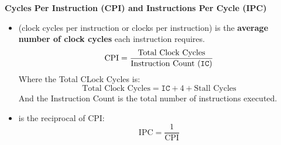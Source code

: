 \highspace
\begin{flushleft}
  \textcolor{Green3}{\faIcon{\speedIcon} \textbf{Cycles Per Instruction (CPI) and Instructions Per Cycle (IPC)}}
\end{flushleft}
\begin{itemize}
  \item {} (clock cycles per instruction or clocks per instruction) is the \textbf{average number of clock cycles} each instruction requires.
  \begin{equation}
    \text{CPI} = \dfrac{
      \text{Total Clock Cycles}
    }{
      \text{Instruction Count (\texttt{IC})}
    }
  \end{equation}
  Where the Total CLock Cycles is:
  \begin{equation*}
    \text{Total Clock Cycles} = \texttt{IC} + 4 + \text{Stall Cycles}
  \end{equation*}
  And the Instruction Count is the total number of instructions executed.


  \item {} is the reciprocal of CPI:
  \begin{equation}
    \text{IPC} = \frac{1}{\text{CPI}}
  \end{equation}


  \newpage



\end{itemize}
